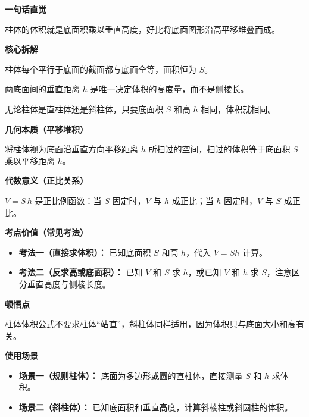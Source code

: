 \begin{explanationbox}
	\textbf{\textcolor{CExplanation}{一句话直觉}}

	柱体的体积就是底面积乘以垂直高度，好比将底面图形沿高平移堆叠而成。

	\medskip
	\textbf{\textcolor{CExplanation}{核心拆解}}
	\begin{description}[style=nextline, leftmargin=2.8em, labelsep=0.5em, itemsep=0.45em]
		\item[\textbf{要点一（底面积固定）：}] 柱体每个平行于底面的截面都与底面全等，面积恒为 $S$。
		\item[\textbf{要点二（垂直高度）：}] 两底面间的垂直距离 $h$ 是唯一决定体积的高度量，而不是侧棱长。
		\item[\textbf{要点三（形状无关）：}] 无论柱体是直柱体还是斜柱体，只要底面积 $S$ 和高 $h$ 相同，体积就相同。
	\end{description}

	\medskip
	\textbf{\textcolor{CExplanation}{几何本质（平移堆积）}}

	将柱体视为底面沿垂直方向平移距离 $h$ 所扫过的空间，扫过的体积等于底面积 $S$ 乘以平移距离 $h$。

	\medskip
	\textbf{\textcolor{CExplanation}{代数意义（正比关系）}}

	$V = S\,h$ 是正比例函数：当 $S$ 固定时，$V$ 与 $h$ 成正比；当 $h$ 固定时，$V$ 与 $S$ 成正比。

	\medskip
	\textbf{\textcolor{CExplanation}{考点价值（常见考法）}}
	\begin{itemize}[leftmargin=*, itemsep=0.5em, topsep=0.4em]
		\item \textbf{考法一（直接求体积）：} 已知底面积 $S$ 和高 $h$，代入 $V = Sh$ 计算。
		\item \textbf{考法二（反求高或底面积）：} 已知 $V$ 和 $S$ 求 $h$，或已知 $V$ 和 $h$ 求 $S$，注意区分垂直高度与侧棱长度。
	\end{itemize}

	\medskip
	\textbf{\textcolor{CExplanation}{顿悟点}}

	柱体体积公式不要求柱体“站直”，斜柱体同样适用，因为体积只与底面大小和高有关。

	\medskip
	\textbf{\textcolor{CExplanation}{使用场景}}
	\begin{itemize}[leftmargin=*, itemsep=0.5em, topsep=0.4em]
		\item \textbf{场景一（规则柱体）：} 底面为多边形或圆的直柱体，直接测量 $S$ 和 $h$ 求体积。
		\item \textbf{场景二（斜柱体）：} 已知底面积和垂直高度，计算斜棱柱或斜圆柱的体积。
	\end{itemize}
\end{explanationbox}
